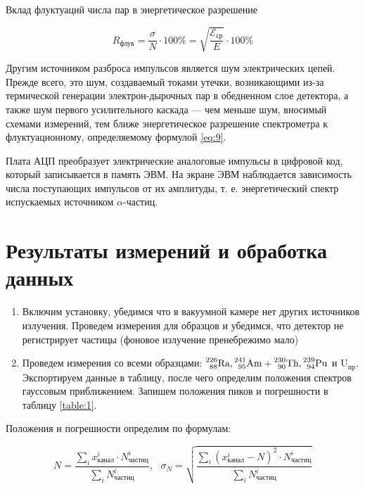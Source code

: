 \documentclass[a4paper,12pt]{article}
\begin{document}
Вклад флуктуаций числа пар в энергетическое разрешение

\begin{equation}\label{eq:10}
    R_\text{флук} = \frac{\sigma}{N} \cdot 100 \% = \sqrt{\frac{\mathcal{E}_\text{ср}}{E}} \cdot 100 \%
\end{equation}

Другим источником разброса импульсов является шум электрических цепей. Прежде всего, это шум, создаваемый токами утечки, возникающими из-за термической генерации электрон-дырочных пар в обедненном слое детектора, а также шум первого усилительного каскада — чем меньше шум, вносимый схемами измерений, тем ближе энергетическое разрешение спектрометра к флуктуационному, определяемому формулой \eqref{eq:9}.

Плата АЦП преобразует электрические аналоговые импульсы в цифровой код, который записывается в память ЭВМ. На экране ЭВМ наблюдается зависимость числа поступающих импульсов от их амплитуды, т. е. энергетический спектр испускаемых источником $\alpha$-частиц.

\section{Результаты измерений и обработка данных}

\begin{enumerate}
    \item Включим установку, убедимся что в вакуумной камере нет других источников излучения. Проведем измерения для образцов и убедимся, что детектор не регистрирует частицы (фоновое излучение пренебрежимо мало)
    \item Проведем измерения со всеми образцами: $\prescript{226}{88}{\text{Ra}}, \prescript{241}{95}{\text{Am}} + \prescript{230}{90}{\text{Th}}, \prescript{239}{94}{\text{Pu}}$ и $\text{U}_\text{пр}$. Экспортируем данные в таблицу, после чего определим положения спектров гауссовым приближением. Запишем положения пиков и погрешности в таблицу \ref{table:1}.
\end{enumerate}

Положения и погрешности определим по формулам:

\begin{equation}\label{eq:11}
    N = \frac{\sum\limits_i x^i_\text{канал} \cdot N^i_\text{частиц}}{\sum\limits_i N^i_\text{частиц}}, \ \ \ \sigma_N = \sqrt{\frac{\sum\limits_i \left(x^i_\text{канал} - N \right)^2 \cdot N^i_\text{частиц}}{\sum\limits_i N^i_\text{частиц}}}
\end{equation}
\end{document}

